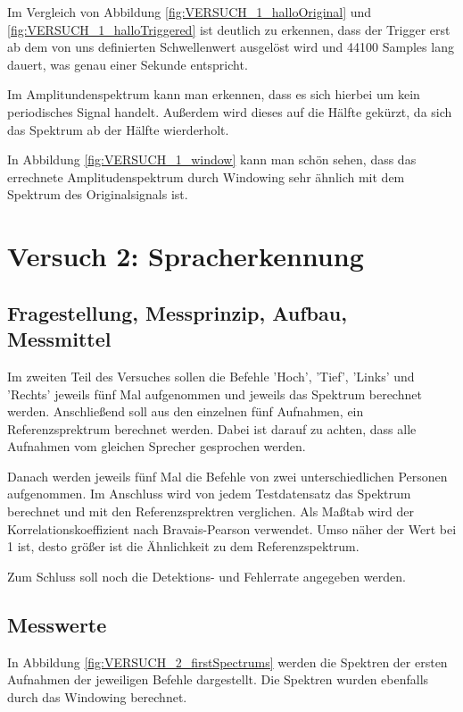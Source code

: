 \documentclass[12pt, oneside, a4paper, \docLanguage]{report}
\begin{document}
Im Vergleich von Abbildung \ref{fig:VERSUCH_1_halloOriginal} und \ref{fig:VERSUCH_1_halloTriggered} ist deutlich zu erkennen, dass der Trigger erst ab dem von uns definierten Schwellenwert ausgelöst wird und 44100 Samples lang dauert, was genau einer Sekunde entspricht.

Im Amplitundenspektrum kann man erkennen, dass es sich hierbei um kein periodisches Signal handelt. Außerdem wird dieses auf die Hälfte gekürzt, da sich das Spektrum ab der Hälfte wierderholt.

In Abbildung \ref{fig:VERSUCH_1_window} kann man schön sehen, dass das errechnete Amplitudenspektrum durch Windowing sehr ähnlich mit dem Spektrum des Originalsignals ist.

%
%
\chapter{Versuch 2: Spracherkennung}
\label{chap:VERSUCH_2}

\section{Fragestellung, Messprinzip, Aufbau, Messmittel}
\label{chap:VERSUCH_2_FRAGESTELLUNG}
Im zweiten Teil des Versuches sollen die Befehle 'Hoch', 'Tief', 'Links' und 'Rechts' jeweils fünf Mal aufgenommen und jeweils das Spektrum berechnet werden. Anschließend soll aus den einzelnen fünf Aufnahmen, ein Referenzsprektrum berechnet werden. Dabei ist darauf zu achten, dass alle Aufnahmen vom gleichen Sprecher gesprochen werden.

Danach werden jeweils fünf Mal die Befehle von zwei unterschiedlichen Personen aufgenommen. Im Anschluss wird von jedem Testdatensatz das Spektrum berechnet und mit den Referenzsprektren verglichen. Als Maßtab wird der Korrelationskoeffizient nach Bravais-Pearson verwendet. Umso näher der Wert bei 1 ist, desto größer ist die Ähnlichkeit zu dem Referenzspektrum.

Zum Schluss soll noch die Detektions- und Fehlerrate angegeben werden.
\newpage
\section{Messwerte}
\label{chap:VERSUCH_2_MESSWERTE}
In Abbildung \ref{fig:VERSUCH_2_firstSpectrums} werden die Spektren der ersten Aufnahmen der jeweiligen Befehle dargestellt. Die Spektren wurden ebenfalls durch das Windowing berechnet.
\end{document}
